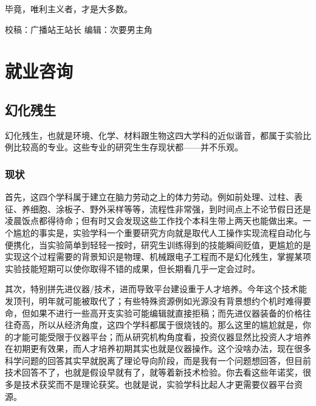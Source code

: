 \documentclass[
]{book}
\begin{document}
毕竟，唯利主义者，才是大多数。

校稿：广播站王站长
编辑：次要男主角

\hypertarget{ux5c31ux4e1aux54a8ux8be2}{%
\chapter{就业咨询}\label{ux5c31ux4e1aux54a8ux8be2}}

\hypertarget{ux5e7bux5316ux6b8bux751f}{%
\section{幻化残生}\label{ux5e7bux5316ux6b8bux751f}}

幻化残生，也就是环境、化学、材料跟生物这四大学科的近似谐音，都属于实验比例比较高的专业。这些专业的研究生生存现状都------并不乐观。

\hypertarget{ux73b0ux72b6}{%
\subsection{现状}\label{ux73b0ux72b6}}

首先，这四个学科属于建立在脑力劳动之上的体力劳动。例如前处理、过柱、表征、养细胞、涂板子、野外采样等等，流程性非常强，到时间点上不论节假日还是凌晨饭点都得待命；但有时又会发现这些工作找个本科生带上两天也能做出来。一个尴尬的事实是，实验学科一个重要研究方向就是取代人工操作实现流程自动化与便携化，当实验简单到轻轻一按时，研究生训练得到的技能瞬间贬值，更尴尬的是实现这个过程需要的背景知识是物理、机械跟电子工程而不是幻化残生，掌握某项实验技能短期可以使你取得不错的成果，但长期看几乎一定会过时。

其次，特别拼先进仪器/技术，进而导致平台建设重于人才培养。今年这个技术能发顶刊，明年就可能被取代了；有些特殊资源例如光源没有背景想约个机时难得要命，但如果不进行一些高开支实验可能编辑就直接拒稿；而先进仪器装备的价格往往奇高，所以从经济角度，这四个学科都属于很烧钱的。那么这里的尴尬就是，你的才能可能受限于仪器平台；而从研究机构角度看，投资仪器显然比投资人才培养在初期更有效果，而人才培养初期其实也就是仪器操作。这个没啥办法，现在很多科学问题的回答其实早就脱离了理论导向阶段，而是我有一个问题想回答，但目前技术回答不了，也就是假设早就有了，就等着新技术检验。你去看这些年诺奖，很多是技术获奖而不是理论获奖。也就是说，实验学科比起人才更需要仪器平台资源。
\end{document}
